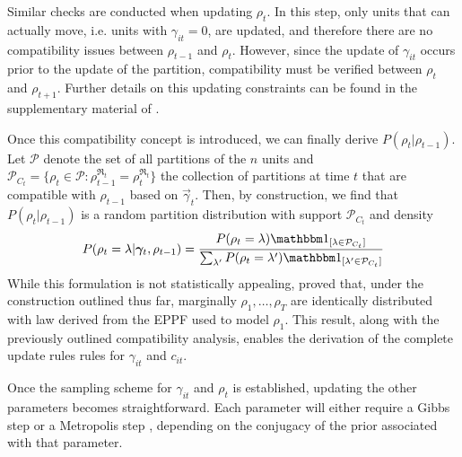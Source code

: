 \documentclass[12pt,	%
	a4paper,		%
	twoside,		%
	openright,		%
	titlepage,%
	]{book}
\theoremstyle{definition}
\let\cite\citep
\begin{document}
Similar checks are conducted when updating $\rho_t$. In this step, only units that can actually move, i.e. units with $\gamma_{it}=0$, are updated, and therefore there are no compatibility issues between $\rho_{t-1}$ and $\rho_t$. However, since the update of $\gamma_{it}$ occurs prior to the update of the partition, compatibility must be verified between $\rho_{t}$ and $\rho_{t+1}$. Further details on this updating constraints can be found in the supplementary material of \cite{1-drpm}.



Once this compatibility concept is introduced, we can finally derive $P(\rho_t|\rho_{t-1})$. Let $\mathcal{P}$ denote the set of all partitions of the $n$ units and $\mathcal{P}_{C_t}=\{ \rho_t \in \mathcal{P} : \rho_{t-1}^{\mathfrak{R}_t} = \rho_t^{\mathfrak{R}_t} \}$ the collection of partitions at time $t$ that are compatible with $\rho_{t-1}$ based on $\vec{\gamma}_t$. Then, by construction, we find that $P(\rho_t|\rho_{t-1})$ is a random partition distribution with support $\mathcal{P}_{C_t}$ and density
\[
P(\rho_t=\lambda|\vec{\gamma}_t,\rho_{t-1}) = \frac{P(\rho_t = \lambda) \indicator{\lambda \in \mathcal{P}_{C_t}}}{\sum_{\lambda'} P(\rho_t = \lambda') \indicator{\lambda' \in \mathcal{P}_{C_t}}}
\]
While this formulation is not statistically appealing, \cite{1-drpm} proved that, under the construction outlined thus far, %
marginally $\rho_1,\ldots, \rho_T$ are identically distributed with law derived from the EPPF used to model $\rho_1$. This result, along with the previously outlined compatibility analysis, enables the derivation of the complete update rules rules for $\gamma_{it}$ and $c_{it}$.

Once the sampling scheme for $\gamma_{it}$ and $\rho_t$ is established, updating the other parameters becomes straightforward. Each parameter will either require a Gibbs step \cite{gibbs-1} \cite{gibbs-2} or a Metropolis step \cite{metropolis}, depending on the conjugacy of the prior associated with that parameter.
\end{document}
